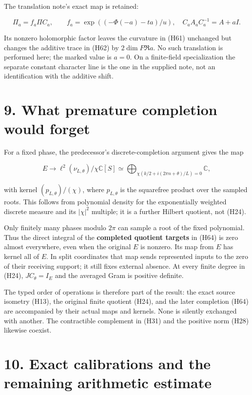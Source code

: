 \documentclass[
]{article}
\begin{document}
The translation note's exact map is retained:

\[
 \Pi_a=f_a\Pi C_a,\qquad
 f_a=\exp((-\Phi(-a)-ta)/u),\quad
 C_aA_aC_a^{-1}=A+aI.
 \tag{H63}
\]

Its nonzero holomorphic factor leaves the curvature in (H61) unchanged
but changes the additive trace in (H62) by \(2\dim F\Re a\). No such
translation is performed here; the marked value is \(a=0\). On a
finite-field specialization the separate constant character line is the
one in the supplied note, not an identification with the additive shift.

\section{9. What premature completion would
forget}\label{what-premature-completion-would-forget}

For a fixed phase, the predecessor's discrete-completion argument gives
the map

\[
 E\longrightarrow
 \ell^2(\nu_{L,\theta})/
 \overline{\chi\mathbb C[S]}
 \simeq\bigoplus_{\chi(k/2+i(2\pi n+\theta)/L)=0}\mathbb C,
 \tag{H64}
\]

with kernel \((p_{L,\theta})/(\chi)\), where \(p_{L,\theta}\) is the
squarefree product over the sampled roots. This follows from polynomial
density for the exponentially weighted discrete measure and its
\(|\chi|^2\) multiple; it is a further Hilbert quotient, not (H24).

Only finitely many phases modulo \(2\pi\) can sample a root of the fixed
polynomial. Thus the direct integral of the \textbf{completed quotient
targets} in (H64) is zero almost everywhere, even when the original
\(E\) is nonzero. Its map from \(E\) has kernel all of \(E\). In split
coordinates that map sends represented inputs to the zero of their
receiving support; it still fixes external absence. At every finite
degree in (H24), \(JC_\theta=I_E\) and the averaged Gram is positive
definite.

The typed order of operations is therefore part of the result: the exact
source isometry (H13), the original finite quotient (H24), and the later
completion (H64) are accompanied by their actual maps and kernels. None
is silently exchanged with another. The contractible complement in (H31)
and the positive norm (H28) likewise coexist.

\section{10. Exact calibrations and the remaining arithmetic
estimate}\label{exact-calibrations-and-the-remaining-arithmetic-estimate}
\end{document}
